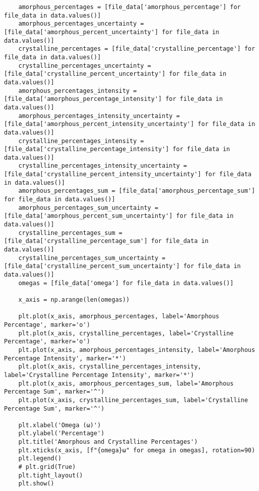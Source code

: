 \begin{small}
\begin{verbatim}
    amorphous_percentages = [file_data['amorphous_percentage'] for file_data in data.values()]
    amorphous_percentages_uncertainty = [file_data['amorphous_percent_uncertainty'] for file_data in data.values()]
    crystalline_percentages = [file_data['crystalline_percentage'] for file_data in data.values()]
    crystalline_percentages_uncertainty = [file_data['crystalline_percent_uncertainty'] for file_data in data.values()]
    amorphous_percentages_intensity = [file_data['amorphous_percentage_intensity'] for file_data in data.values()]
    amorphous_percentages_intensity_uncertainty = [file_data['amorphous_percent_intensity_uncertainty'] for file_data in data.values()]
    crystalline_percentages_intensity = [file_data['crystalline_percentage_intensity'] for file_data in data.values()]
    crystalline_percentages_intensity_uncertainty = [file_data['crystalline_percent_intensity_uncertainty'] for file_data in data.values()]
    amorphous_percentages_sum = [file_data['amorphous_percentage_sum'] for file_data in data.values()]
    amorphous_percentages_sum_uncertainty = [file_data['amorphous_percent_sum_uncertainty'] for file_data in data.values()]
    crystalline_percentages_sum = [file_data['crystalline_percentage_sum'] for file_data in data.values()]
    crystalline_percentages_sum_uncertainty = [file_data['crystalline_percent_sum_uncertainty'] for file_data in data.values()]
    omegas = [file_data['omega'] for file_data in data.values()]

    x_axis = np.arange(len(omegas))

    plt.plot(x_axis, amorphous_percentages, label='Amorphous Percentage', marker='o')
    plt.plot(x_axis, crystalline_percentages, label='Crystalline Percentage', marker='o')
    plt.plot(x_axis, amorphous_percentages_intensity, label='Amorphous Percentage Intensity', marker='*')
    plt.plot(x_axis, crystalline_percentages_intensity, label='Crystalline Percentage Intensity', marker='*')
    plt.plot(x_axis, amorphous_percentages_sum, label='Amorphous Percentage Sum', marker='^')
    plt.plot(x_axis, crystalline_percentages_sum, label='Crystalline Percentage Sum', marker='^')

    plt.xlabel('Omega (ω)')
    plt.ylabel('Percentage')
    plt.title('Amorphous and Crystalline Percentages')
    plt.xticks(x_axis, [f"{omega}ω" for omega in omegas], rotation=90)
    plt.legend()
    # plt.grid(True)
    plt.tight_layout()
    plt.show()


\end{verbatim}
\end{small}
